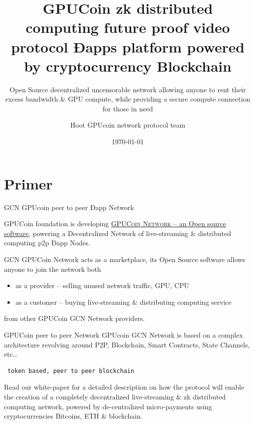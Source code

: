 \documentclass[10pt,handout]{beamer}
\title{GPUCoin zk distributed computing future proof video protocol Ðapps platform powered by cryptocurrency Blockchain}
\subtitle{Open Source decentralized uncensorable network allowing anyone to rent their excess bandwidth \& GPU compute, while providing a secure compute connection for those in need}
\date{\today}
\author{Hoot GPUcoin network protocol team}
\institute{Hoot GPUcoin Foundation}
\newcommand{\themename}{\textbf{\textsc{metropolis}}\xspace}
\begin{document}
\maketitle


\section{Primer}

\begin{frame}[fragile]{GCN GPUcoin peer to peer Ðapp Network }

 GPUCoin foundation is developing \href{https://onhoot.com/tokensale}{\textsc{GPUCoin Network} – an Open source software}, powering a Decentralized Network of live-streaming \& distributed computing p2p Ðapp Nodes.
 

GCN GPUCoin Network acts as a marketplace, its Open Source software allows anyone to join the network both 

\begin{itemize}
\item as a provider – selling unused network traffic, GPU, CPU
\item as a customer – buying live-streaming \& distributing computing service
\end{itemize}
 from other GPUCoin GCN Network providers. 
\end{frame}
\begin{frame}[fragile]{GPUCoin peer to peer Network }
GPUcoin GCN Network is based on a complex architecture revolving around P2P, Blockchain, Smart Contracts, State Channels, etc\ldots
 \begin{verbatim} 
 token based, peer to peer blockchain 
 \end{verbatim}
 
 Read our white-paper for a detailed description on how the protocol will enable the creation of a completely decentralized live-streaming \& zk distributed computing network, powered by de-centralized micro-payments using cryptocurrencies Bitcoins, ETH \& blockchain. 


\end{frame}
\end{document}
